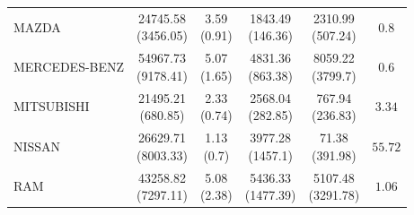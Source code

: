 \begin{tabular}{lccccc}
MAZDA & \makecell{24745.58 \\ (3456.05)\\[0.25em]} & \makecell{3.59 \\ (0.91)\\[0.25em]} & \makecell{1843.49 \\ (146.36)\\[0.25em]} & \makecell{2310.99 \\ (507.24)\\[0.25em]} & $0.8$ \\
MERCEDES-BENZ & \makecell{54967.73 \\ (9178.41)\\[0.25em]} & \makecell{5.07 \\ (1.65)\\[0.25em]} & \makecell{4831.36 \\ (863.38)\\[0.25em]} & \makecell{8059.22 \\ (3799.7)\\[0.25em]} & $0.6$ \\
MITSUBISHI & \makecell{21495.21 \\ (680.85)\\[0.25em]} & \makecell{2.33 \\ (0.74)\\[0.25em]} & \makecell{2568.04 \\ (282.85)\\[0.25em]} & \makecell{767.94 \\ (236.83)\\[0.25em]} & $3.34$ \\
NISSAN & \makecell{26629.71 \\ (8003.33)\\[0.25em]} & \makecell{1.13 \\ (0.7)\\[0.25em]} & \makecell{3977.28 \\ (1457.1)\\[0.25em]} & \makecell{71.38 \\ (391.98)\\[0.25em]} & $55.72$ \\
RAM & \makecell{43258.82 \\ (7297.11)\\[0.25em]} & \makecell{5.08 \\ (2.38)\\[0.25em]} & \makecell{5436.33 \\ (1477.39)\\[0.25em]} & \makecell{5107.48 \\ (3291.78)\\[0.25em]} & $1.06$ \\

\end{tabular}
